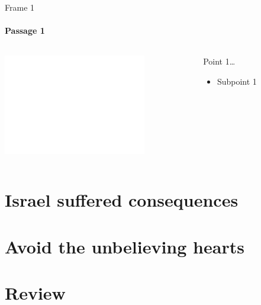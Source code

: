 \begin{frame}{Frame 1}
\framesubtitle{Passage 1}

\begin{columns}[c]
\begin{column}{0.6\textwidth}
	\includegraphics[draft, width=\columnwidth]{figures/dummy.png}
\end{column}
\begin{column}{0.4\textwidth}
	Point 1\ldots
	\begin{itemize}
		\item Subpoint 1
	\end{itemize}
\end{column}
\end{columns}

\end{frame}

\section{Israel suffered consequences}

\section{Avoid the unbelieving hearts}

\section{Review}

